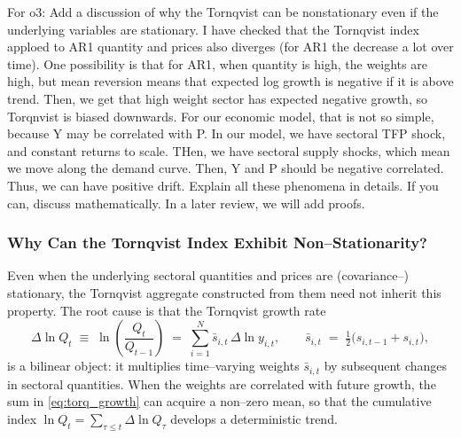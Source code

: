 \documentclass[12pt,english]{article}
\begin{document}
For o3: Add a discussion of why the Tornqvist can be nonstationary even if the underlying variables are stationary. I have checked that the Tornqvist index apploed to AR1 quantity and prices also diverges (for AR1 the decrease a lot over time). One possibility is that for AR1, when quantity is high, the weights are high, but mean reversion means that expected log growth is negative if it is above trend. Then, we get that high weight sector has expected negative growth, so Torqnvist is biased downwards. For our economic model, that is not so simple, because Y may be correlated with P. In our model, we have sectoral TFP shock, and constant returns to scale. THen, we have sectoral supply shocks, which mean we move along the demand curve. Then, Y and P should be negative correlated. Thus, we can have positive drift. Explain all these phenomena in details. If you can, discuss mathematically. In a later review, we will add proofs.
\subsubsection{Why Can the Tornqvist Index Exhibit Non--Stationarity?}
\label{subsec:torq_stationarity}

Even when the underlying sectoral quantities and prices are (covariance--)
stationary, the Tornqvist aggregate constructed from them 
need not inherit this property.  The root cause is that the
Tornqvist growth rate
\begin{equation}
\label{eq:torq_growth}
  \Delta \ln Q_t \;\equiv\; \ln\!\left(\frac{Q_t}{Q_{t-1}}\right)
  \;=\; \sum_{i=1}^{N} \bar{s}_{i,t}\, \Delta \ln y_{i,t},
  \qquad \bar{s}_{i,t}\;=\;\tfrac12\bigl(s_{i,t-1}+s_{i,t}\bigr),
\end{equation}
is a bilinear object: it multiplies time--varying weights
$\bar{s}_{i,t}$ by subsequent changes in sectoral quantities.  When the
weights are correlated with future growth, the sum in \eqref{eq:torq_growth}
can acquire a non--zero mean, so that the cumulative index
$\ln Q_t = \sum_{\tau\le t}\Delta\ln Q_\tau$ develops a deterministic
trend.
\end{document}
